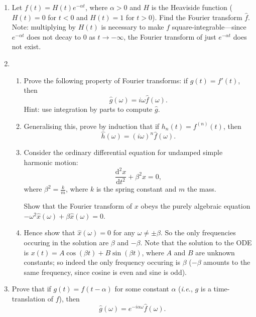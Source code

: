 \documentclass{article}
\newcommand{\deriv}[3][]{\frac{\mathrm{d}^{#1}#2}{\mathrm{d}#3^{#1}}}
\newcommand{\diff}{\;\mathrm{d}}
\begin{document}
\begin{enumerate}
	\item Let $f(t)=H(t)e^{-\alpha t}$, where $\alpha>0$ and $H$ is the Heaviside function ($H(t)=0$ for $t<0$ and $H(t)=1$ for $t>0$). Find the Fourier transform $\hat{f}$. Note: multiplying by $H(t)$ is necessary to make $f$ square-integrable---since $e^{-\alpha t}$ does not decay to 0 as $t\to -\infty$, the Fourier transform of just $e^{-\alpha t}$ does not exist.
	\item
		\begin{enumerate}
			\item Prove the following property of Fourier transforms: if $g(t)=f'(t)$, then
				\[\hat{g}(\omega) = i\omega\hat{f}(\omega).\]
				Hint: use integration by parts to compute $\hat{g}$.
			\item Generalising this, prove by induction that if $h_n(t)=f^{(n)}(t)$, then
				\[\hat{h}(\omega) = \left(i\omega\right)^n\hat{f}(\omega).\]
			\item Consider the ordinary differential equation for undamped simple harmonic motion:
				\[\deriv[2]{x}{t}+\beta^2 x=0,\]
				where $\beta^2=\frac{k}{m}$, where $k$ is the spring constant and $m$ the mass.
				
				Show that the Fourier transform of $x$ obeys the purely algebraic equation $-\omega^2\hat{x}(\omega) +\beta\hat{x}(\omega)=0$.
			\item Hence show that $\hat{x}(\omega)=0$ for any $\omega\neq \pm\beta$. So the only frequencies occuring in the solution are $\beta$ and $-\beta$. Note that the solution to the ODE is $x(t)=A\cos(\beta t)+B\sin(\beta t)$, where $A$ and $B$ are unknown constants; so indeed the only frequency occuring is $\beta$ ($-\beta$ amounts to the same frequency, since cosine is even and sine is odd).
		\end{enumerate}
	\item Prove that if $g(t)=f(t-\alpha)$ for some constant $\alpha$ (\textit{i.e.}, $g$ is a time-translation of $f$), then
		\[\hat{g}(\omega) = e^{-i\alpha\omega}\hat{f}(\omega).\]
\end{enumerate}
\end{document}
